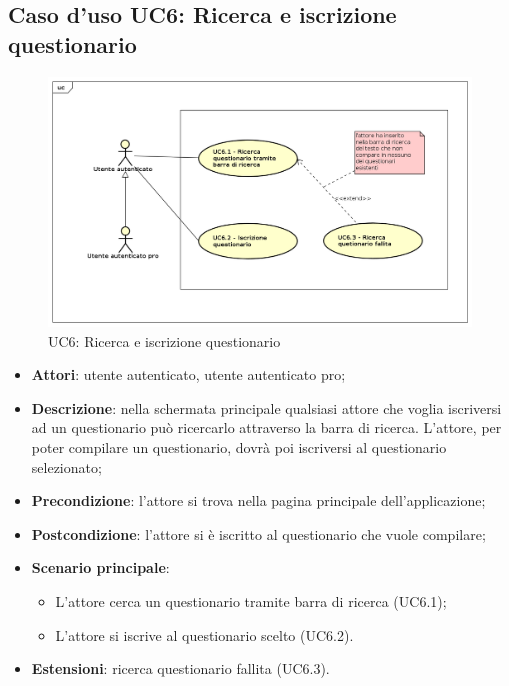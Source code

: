 \newpage
\subsection{Caso d'uso UC6: Ricerca e iscrizione questionario}
\label{UC6}
\begin{figure}[h]
\centering
\includegraphics[scale=0.5,keepaspectratio]{UML/UC6.png}
\caption{UC6: Ricerca e iscrizione questionario}
\end{figure}
\FloatBarrier
\begin{itemize}
\item\textbf{Attori}: utente autenticato, utente autenticato pro;
\item\textbf{Descrizione}: nella schermata principale qualsiasi attore che voglia iscriversi ad un questionario può ricercarlo attraverso la barra di ricerca. L'attore, per poter compilare un questionario, dovrà poi iscriversi al questionario selezionato;	
\item\textbf{Precondizione}: l'attore si trova nella pagina principale dell'applicazione;
\item\textbf{Postcondizione}: l'attore si è iscritto al questionario che vuole compilare;
\item\textbf{Scenario principale}:
\begin{itemize}
\item L'attore cerca un questionario tramite barra di ricerca (UC6.1);
\item L'attore si iscrive al questionario scelto (UC6.2).
\end{itemize}
\item\textbf{Estensioni}: ricerca questionario fallita (UC6.3).
\end{itemize}

